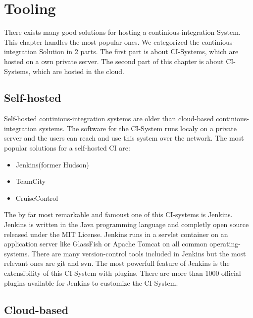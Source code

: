 \section{Tooling}\label{sec:tooling}

There exists many good solutions for hosting a continious-integration System. This chapter handles the most popular ones. We categorized the continious-integration Solution in 2 parts. The first part is about CI-Systems, which are hosted on a own private server. The second part of this chapter is about CI-Systems, which are hosted in the cloud.

\subsection{Self-hosted}\label{sec:tooling-self-hosted}

Self-hosted continious-integration systems are older than cloud-based continious-integration systems.
The software for the CI-System runs localy on a private server and the users can reach and use this system over the network. The most popular solutions for a self-hosted CI are:
\begin{itemize} 
    \item Jenkins(former Hudson) 
    \item TeamCity 
    \item CruiseControl
\end{itemize}
The by far most remarkable and famoust one of this CI-systems is Jenkins. 
Jenkins is written in the Java programming language and completly open source released under the MIT License. Jenkins runs in a servlet container on an application server like GlassFish or Apache Tomcat on all common operating-systems. There are many version-control tools included in Jenkins but the most relevant ones are git and svn. The most powerfull feature of Jenkins is the extensibility of this CI-System with plugins. There are more than 1000 official plugins available for Jenkins to customize the CI-System.  

\subsection{Cloud-based}\label{sec:tooling-cloud-based}

